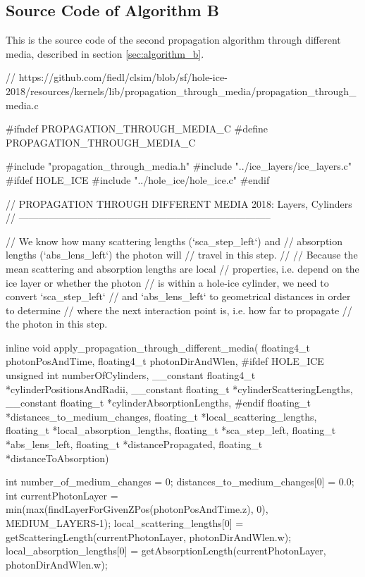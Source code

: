 
\subsection{Source Code of Algorithm B}
\label{sec:algorithm_b_source}

This is the source code of the second propagation algorithm through different media, described in section \ref{sec:algorithm_b}.


\begin{ccode}
// https://github.com/fiedl/clsim/blob/sf/hole-ice-2018/resources/kernels/lib/propagation_through_media/propagation_through_media.c

#ifndef PROPAGATION_THROUGH_MEDIA_C
#define PROPAGATION_THROUGH_MEDIA_C

#include "propagation_through_media.h"
#include "../ice_layers/ice_layers.c"
#ifdef HOLE_ICE
  #include "../hole_ice/hole_ice.c"
#endif


// PROPAGATION THROUGH DIFFERENT MEDIA 2018: Layers, Cylinders
// -----------------------------------------------------------------------------

// We know how many scattering lengths (`sca_step_left`) and
// absorption lengths (`abs_lens_left`) the photon will
// travel in this step.
//
// Because the mean scattering and absorption lengths are local
// properties, i.e. depend on the ice layer or whether the photon
// is within a hole-ice cylinder, we need to convert `sca_step_left`
// and `abs_lens_left` to geometrical distances in order to determine
// where the next interaction point is, i.e. how far to propagate
// the photon in this step.

inline void apply_propagation_through_different_media(
  floating4_t photonPosAndTime, floating4_t photonDirAndWlen,
  #ifdef HOLE_ICE
    unsigned int numberOfCylinders, __constant floating4_t *cylinderPositionsAndRadii,
    __constant floating_t *cylinderScatteringLengths, __constant floating_t *cylinderAbsorptionLengths,
  #endif
  floating_t *distances_to_medium_changes, floating_t *local_scattering_lengths, floating_t *local_absorption_lengths,
  floating_t *sca_step_left, floating_t *abs_lens_left,
  floating_t *distancePropagated, floating_t *distanceToAbsorption)
{

  int number_of_medium_changes = 0;
  distances_to_medium_changes[0] = 0.0;
  int currentPhotonLayer = min(max(findLayerForGivenZPos(photonPosAndTime.z), 0), MEDIUM_LAYERS-1);
  local_scattering_lengths[0] = getScatteringLength(currentPhotonLayer, photonDirAndWlen.w);
  local_absorption_lengths[0] = getAbsorptionLength(currentPhotonLayer, photonDirAndWlen.w);

}
\end{ccode}
